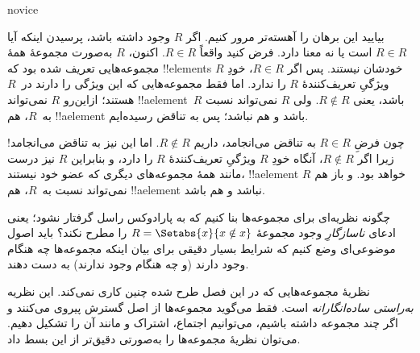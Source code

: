\documentclass[../../../include/open-logic-section]{subfiles}
\begin{document}
\begin{tagblock}{novice}
\begin{explain}
بیایید این برهان را آهسته‌تر مرور کنیم. اگر $R$ وجود داشته باشد، پرسیدن
اینکه آیا $R \in
R$ است یا نه معنا دارد. فرض کنید واقعاً $R \in R$. اکنون، $R$ به‌صورت
مجموعهٔ همهٔ مجموعه‌هایی تعریف شده بود که !!{element}s خودشان نیستند. پس
اگر $R \in R$، خودِ $R$ ویژگیِ تعریف‌کنندهٔ $R$ را ندارد. اما فقط
مجموعه‌هایی که این ویژگی را دارند در~$R$ هستند؛ ازاین‌رو $R$ نمی‌تواند
!!a{element}~$R$ باشد، یعنی $R \notin R$. ولی $R$ نمی‌تواند نسبت
به~$R$، هم !!a{element} باشد و هم نباشد؛ پس به تناقض رسیده‌ایم.

چون فرضِ $R \in R$ به تناقض می‌انجامد، داریم $R \notin R$. اما این نیز
به تناقض می‌انجامد!{} زیرا اگر $R
\notin R$، آنگاه خودِ $R$ ویژگیِ تعریف‌کنندهٔ $R$ را دارد، و بنابراین
$R$ نیز درست مانند همهٔ مجموعه‌های دیگری که عضو خود نیستند، !!a{element}
$R$ خواهد بود. و باز هم نمی‌تواند نسبت به~$R$، هم !!a{element} نباشد و
هم باشد.
\end{explain}
\end{tagblock}

\begin{digress}
چگونه نظریه‌ای برای مجموعه‌ها بنا کنیم که به پارادوکس راسل گرفتار نشود؛
یعنی ادعای \emph{ناسازگارِ} وجود مجموعهٔ
$R = \Setabs{x}{x \notin x}$ را مطرح نکند؟ باید اصول موضوعی‌ای وضع کنیم
که شرایط بسیار دقیقی برای بیان اینکه مجموعه‌ها چه هنگام وجود دارند (و چه
هنگام وجود ندارند) به دست دهند.

نظریهٔ مجموعه‌هایی که در این فصل طرح شده چنین کاری نمی‌کند. این نظریه
\emph{به‌راستی ساده‌انگارانه} است. فقط می‌گوید مجموعه‌ها از اصل گسترش
پیروی می‌کنند و اگر چند مجموعه
داشته باشیم، می‌توانیم اجتماع، اشتراک و مانند آن را تشکیل دهیم. می‌توان
نظریهٔ مجموعه‌ها را به‌صورتی دقیق‌تر از این بسط داد.
\end{digress}
\end{document}
